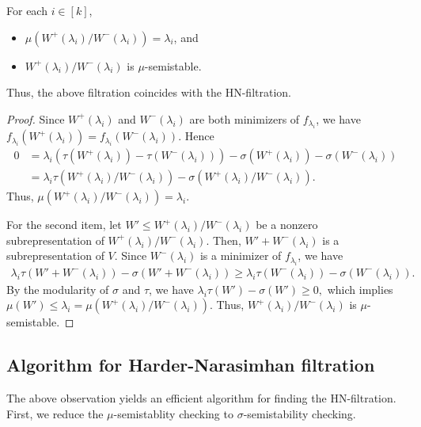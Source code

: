 \documentclass[a4paper,11pt]{article}
\numberwithin{equation}{section}
\begin{document}
\begin{theorem}
    For each $i \in [k]$,
    \begin{itemize}
        \item $\mu(W^+(\lambda_i) / W^-(\lambda_i)) = \lambda_i$, and
        \item $W^+(\lambda_i) / W^-(\lambda_i)$ is $\mu$-semistable.
    \end{itemize}
    Thus, the above filtration coincides with the HN-filtration.
\end{theorem}
\begin{proof}
    Since $W^+(\lambda_i)$ and $W^-(\lambda_i)$ are both minimizers of $f_{\lambda_i}$, we have $f_{\lambda_i}(W^+(\lambda_i)) = f_{\lambda_i}(W^-(\lambda_i))$.
    Hence
    \begin{align}
        0 &= \lambda_i (\tau(W^+(\lambda_i)) - \tau(W^-(\lambda_i))) - \sigma(W^+(\lambda_i)) - \sigma(W^-(\lambda_i)) \\
        &= \lambda_i \tau(W^+(\lambda_i) / W^-(\lambda_i)) - \sigma(W^+(\lambda_i) / W^-(\lambda_i)).
    \end{align}
    Thus, $\mu(W^+(\lambda_i) / W^-(\lambda_i)) = \lambda_i$.

    For the second item, let $W' \leq W^+(\lambda_i) / W^-(\lambda_i)$ be a nonzero subrepresentation of $W^+(\lambda_i) / W^-(\lambda_i)$.
    Then, $W' + W^-(\lambda_i)$ is a subrepresentation of $V$.
    Since $W^- (\lambda_i)$ is a minimizer of $f_{\lambda_i}$, we have
    \begin{align}
        \lambda_i \tau(W' + W^-(\lambda_i)) - \sigma(W' + W^-(\lambda_i)) \geq \lambda_i \tau(W^- (\lambda_i)) - \sigma(W^- (\lambda_i)).
    \end{align}
    By the modularity of $\sigma$ and $\tau$, we have
    $
        \lambda_i \tau(W') - \sigma(W') \geq 0,
    $
    which implies $\mu(W') \leq \lambda_i = \mu(W^+(\lambda_i) / W^-(\lambda_i))$.
    Thus, $W^+(\lambda_i) / W^-(\lambda_i)$ is $\mu$-semistable.
\end{proof}

\subsection{Algorithm for Harder-Narasimhan filtration}
The above observation yields an efficient algorithm for finding the HN-filtration.
First, we reduce the $\mu$-semistablity checking to $\sigma$-semistability checking.
\end{document}

